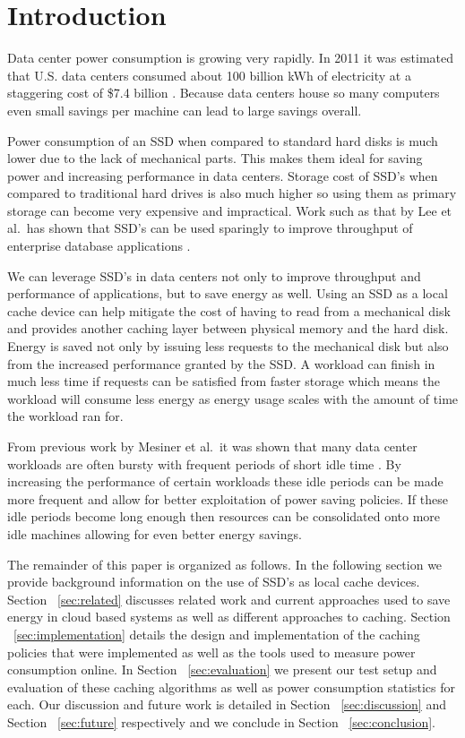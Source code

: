 \section{Introduction}

Data center power consumption is growing very rapidly. In 2011 it was estimated
that U.S. data centers consumed about 100 billion kWh of electricity at a
staggering cost of \$7.4 billion \cite{data-center-power}. Because data centers
house so many computers even small savings per machine can lead to large
savings overall.

Power consumption of an SSD when compared to standard hard disks is much lower
due to the lack of mechanical parts. This makes them ideal for saving power and
increasing performance in data centers. Storage cost of SSD's when compared to
traditional hard drives is also much higher so using them as primary storage can
become very expensive and impractical. Work such as that by Lee et al.\ has
shown that SSD's can be used sparingly to improve throughput of enterprise
database applications \cite{enterprise-ssd}.

We can leverage SSD's in data centers not only to improve throughput and
performance of applications, but to save energy as well. Using an SSD as a local
cache device can help mitigate the cost of having to read from a mechanical disk
and provides another caching layer between physical memory and the hard
disk. Energy is saved not only by issuing less requests to the mechanical disk
but also from the increased performance granted by the SSD. A workload can
finish in much less time if requests can be satisfied from faster storage which
means the workload will consume less energy as energy usage scales with the
amount of time the workload ran for.

From previous work by Mesiner et al.\ it was shown that many data center
workloads are often bursty with frequent periods of short idle time
\cite{powernap}. By increasing the performance of certain workloads these idle
periods can be made more frequent and allow for better exploitation of power
saving policies. If these idle periods become long enough then resources can be
consolidated onto more idle machines allowing for even better energy savings.

The remainder of this paper is organized as follows. In the following section we
provide background information on the use of SSD's as local cache
devices. Section ~\ref{sec:related} discusses related work and current
approaches used to save energy in cloud based systems as well as different
approaches to caching. Section ~\ref{sec:implementation} details the design and
implementation of the caching policies that were implemented as well as the
tools used to measure power consumption online. In Section ~\ref{sec:evaluation}
we present our test setup and evaluation of these caching algorithms as well as
power consumption statistics for each. Our discussion and future work is
detailed in Section ~\ref{sec:discussion} and Section ~\ref{sec:future}
respectively and we conclude in Section ~\ref{sec:conclusion}.
